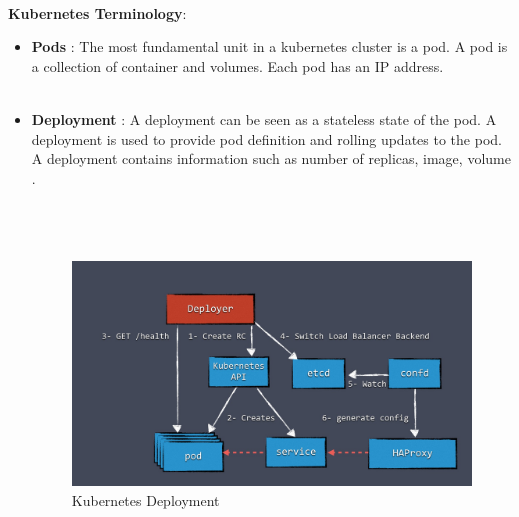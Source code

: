 \documentclass[11pt]{report}
\begin{document}
\begin{enumerate}
\begin{figure}[h!]
		\end{figure}
		\\
		\\
		\\
		\textbf{Kubernetes Terminology}:
		\begin{itemize}
			\item
			\textbf{Pods} : The most fundamental unit in a kubernetes cluster is a pod. A pod is a collection of container and volumes. Each pod has an IP address. 
			\\
			\\
			\item
			\textbf{Deployment} : A deployment can be seen as a stateless state of the pod. A deployment is used to provide pod definition and rolling updates to the pod. A deployment contains information such as number of replicas, image, volume .
			\\
			\\
			\\
			\\
		\begin{figure}[h!]
    	\begin{center}
    		\includegraphics[scale=0.25]{deployment.jpeg}
    		\caption{Kubernetes Deployment \cite{kubedep}}
    	  \end{center}
	  

\end{figure}
\end{itemize}
\end{enumerate}
\end{document}
